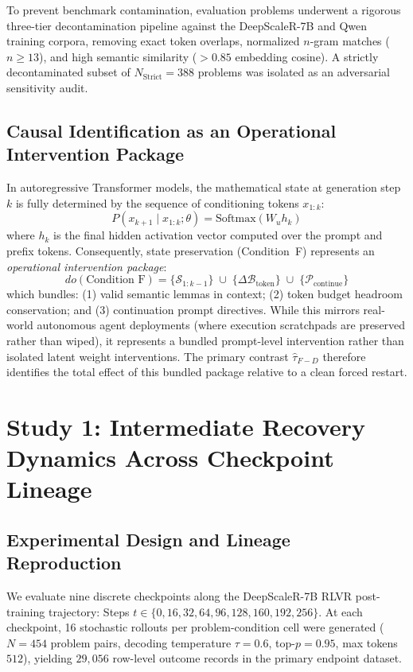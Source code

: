 \documentclass[11pt]{article}
\begin{document}
To prevent benchmark contamination, evaluation problems underwent a rigorous three-tier decontamination pipeline against the DeepScaleR-7B and Qwen training corpora, removing exact token overlaps, normalized $n$-gram matches ($n \ge 13$), and high semantic similarity ($> 0.85$ embedding cosine). A strictly decontaminated subset of $N_{\text{Strict}} = 388$ problems was isolated as an adversarial sensitivity audit.

\subsection{Causal Identification as an Operational Intervention Package}
In autoregressive Transformer models, the mathematical state at generation step $k$ is fully determined by the sequence of conditioning tokens $x_{1:k}$:
\begin{equation}
P(x_{k+1} \mid x_{1:k}; \theta) = \text{Softmax}(W_u h_k)
\end{equation}
where $h_k$ is the final hidden activation vector computed over the prompt and prefix tokens. Consequently, state preservation (Condition~F) represents an \emph{operational intervention package}:
\begin{equation}
do(\text{Condition F}) = \{\mathcal{S}_{1:k-1}\} \;\cup\; \{\Delta \mathcal{B}_{\text{token}}\} \;\cup\; \{\mathcal{P}_{\text{continue}}\}
\end{equation}
which bundles: (1) valid semantic lemmas in context; (2) token budget headroom conservation; and (3) continuation prompt directives. While this mirrors real-world autonomous agent deployments (where execution scratchpads are preserved rather than wiped), it represents a bundled prompt-level intervention rather than isolated latent weight interventions. The primary contrast $\hat{\tau}_{F-D}$ therefore identifies the total effect of this bundled package relative to a clean forced restart.

\section{Study 1: Intermediate Recovery Dynamics Across Checkpoint Lineage}
\label{sec:study1_lineage}

\subsection{Experimental Design and Lineage Reproduction}
We evaluate nine discrete checkpoints along the DeepScaleR-7B RLVR post-training trajectory: Steps $t \in \{0, 16, 32, 64, 96, 128, 160, 192, 256\}$. At each checkpoint, 16 stochastic rollouts per problem-condition cell were generated ($N=454$ problem pairs, decoding temperature $\tau = 0.6$, top-$p = 0.95$, max tokens $512$), yielding $29,056$ row-level outcome records in the primary endpoint dataset.
\end{document}
